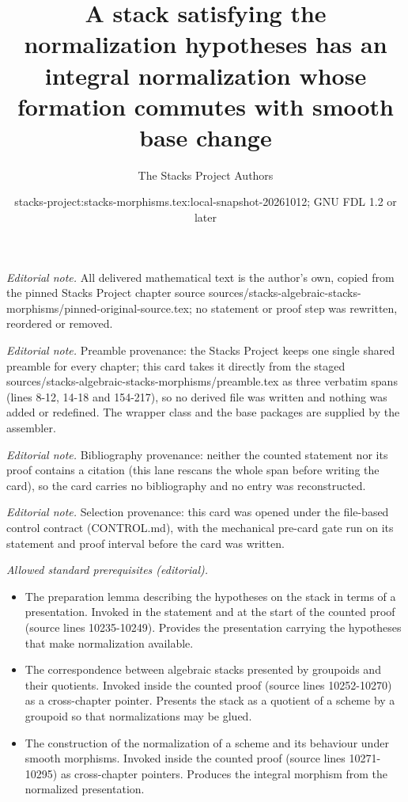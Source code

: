 \documentclass[10pt,a4paper]{amsart}
\title{A stack satisfying the normalization hypotheses has an integral normalization whose formation commutes with smooth base change}
\author{The Stacks Project Authors}
\date{stacks-project:stacks-morphisms.tex:local-snapshot-20261012; GNU FDL 1.2 or later}
\theoremstyle{plain}
\theoremstyle{definition}
\theoremstyle{remark}
\numberwithin{equation}{subsection}
\begin{document}
\maketitle
\noindent\textit{Editorial note.} All delivered mathematical text is the author's own, copied from the pinned Stacks Project chapter source sources/stacks-algebraic-stacks-morphisms/pinned-original-source.tex; no statement or proof step was rewritten, reordered or removed.\par\medskip
\noindent\textit{Editorial note.} Preamble provenance: the Stacks Project keeps one single shared preamble for every chapter; this card takes it directly from the staged sources/stacks-algebraic-stacks-morphisms/preamble.tex as three verbatim spans (lines 8-12, 14-18 and 154-217), so no derived file was written and nothing was added or redefined. The wrapper class and the base packages are supplied by the assembler.\par\medskip
\noindent\textit{Editorial note.} Bibliography provenance: neither the counted statement nor its proof contains a citation (this lane rescans the whole span before writing the card), so the card carries no bibliography and no entry was reconstructed.\par\medskip
\noindent\textit{Editorial note.} Selection provenance: this card was opened under the file-based control contract (CONTROL.md), with the mechanical pre-card gate run on its statement and proof interval before the card was written.\par\medskip
\noindent\textit{Allowed standard prerequisites (editorial).}\begin{itemize}
\item The preparation lemma describing the hypotheses on the stack in terms of a presentation. Invoked in the statement and at the start of the counted proof (source lines 10235-10249). Provides the presentation carrying the hypotheses that make normalization available.
\item The correspondence between algebraic stacks presented by groupoids and their quotients. Invoked inside the counted proof (source lines 10252-10270) as a cross-chapter pointer. Presents the stack as a quotient of a scheme by a groupoid so that normalizations may be glued.
\item The construction of the normalization of a scheme and its behaviour under smooth morphisms. Invoked inside the counted proof (source lines 10271-10295) as cross-chapter pointers. Produces the integral morphism from the normalized presentation.
\end{itemize}\medskip
\end{document}
